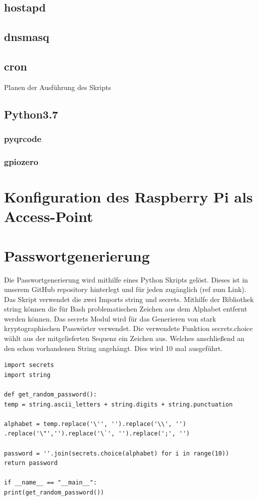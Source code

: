 \documentclass[a4paper,11pt,singlespacing]{article}
\begin{document}
		\subsection{hostapd}
    		\subsection{dnsmasq}
    		\subsection{cron}
			Planen der Ausführung des Skripts
    		\subsection{Python3.7}
    			\subsubsection{pyqrcode}
    			\subsubsection{gpiozero}
    	\section{Konfiguration des Raspberry Pi als Access-Point}
    	
    	\section{Passwortgenerierung}
    		Die Passwortgenerierung wird mithilfe eines Python Skripts gelöst. Dieses ist in unserem GitHub repository hinterlegt und für jeden zugänglich (ref zum Link). Das Skript verwendet die zwei Imports string und secrets. Mithilfe der Bibliothek string können die für Bash problematischen Zeichen aus dem Alphabet entfernt werden können. Das secrets Modul wird für das Generieren von stark kryptographischen Passwörter verwendet. Die verwendete Funktion secrets.choice wählt aus der mitgelieferten Sequenz ein Zeichen aus. Welches anschließend an den schon vorhandenen String angehängt. Dies wird 10 mal ausgeführt.
			\begin{lstlisting}
import secrets
import string

def get_random_password():
temp = string.ascii_letters + string.digits + string.punctuation

alphabet = temp.replace('\'', '').replace('\\', '')
.replace('\"','').replace('\`', '').replace(';', '')

password = ''.join(secrets.choice(alphabet) for i in range(10))
return password

if __name__ == "__main__":
print(get_random_password())
			\end{lstlisting}
\end{document}
